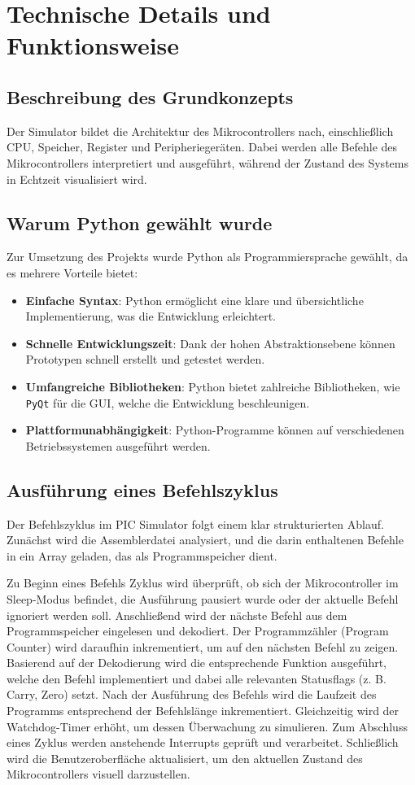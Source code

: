 \chapter{Technische Details und Funktionsweise}

\section{Beschreibung des Grundkonzepts}
Der Simulator bildet die Architektur des Mikrocontrollers nach, einschließlich CPU, Speicher, Register und Peripheriegeräten. Dabei werden alle Befehle des Mikrocontrollers interpretiert und ausgeführt, während der Zustand des Systems in Echtzeit visualisiert wird.

\section{Warum Python gewählt wurde}
Zur Umsetzung des Projekts wurde Python als Programmiersprache gewählt, da es mehrere Vorteile bietet:
\begin{itemize}
    \item \textbf{Einfache Syntax}: Python ermöglicht eine klare und übersichtliche Implementierung, was die Entwicklung erleichtert.
    \item \textbf{Schnelle Entwicklungszeit}: Dank der hohen Abstraktionsebene können Prototypen schnell erstellt und getestet werden.
    \item \textbf{Umfangreiche Bibliotheken}: Python bietet zahlreiche Bibliotheken, wie \texttt{PyQt} für die GUI, welche die Entwicklung beschleunigen.
    \item \textbf{Plattformunabhängigkeit}: Python-Programme können auf verschiedenen Betriebssystemen ausgeführt werden.
\end{itemize}

\section{Ausführung eines Befehlszyklus}

Der Befehlszyklus im PIC Simulator folgt einem klar strukturierten Ablauf. Zunächst wird die Assemblerdatei analysiert, und die darin enthaltenen Befehle in ein Array geladen, das als Programmspeicher dient. 

Zu Beginn eines Befehls Zyklus wird überprüft, ob sich der Mikrocontroller im Sleep-Modus befindet, die Ausführung pausiert wurde oder der aktuelle Befehl ignoriert werden soll. Anschließend wird der nächste Befehl aus dem Programmspeicher eingelesen und dekodiert. Der Programmzähler (Program Counter) wird daraufhin inkrementiert, um auf den nächsten Befehl zu zeigen. Basierend auf der Dekodierung wird die entsprechende Funktion ausgeführt, welche den Befehl implementiert und dabei alle relevanten Statusflags (z. B. Carry, Zero) setzt. Nach der Ausführung des Befehls wird die Laufzeit des Programms entsprechend der Befehlslänge inkrementiert. Gleichzeitig wird der Watchdog-Timer erhöht, um dessen Überwachung zu simulieren. Zum Abschluss eines Zyklus werden anstehende Interrupts geprüft und verarbeitet. Schließlich wird die Benutzeroberfläche aktualisiert, um den aktuellen Zustand des Mikrocontrollers visuell darzustellen.


